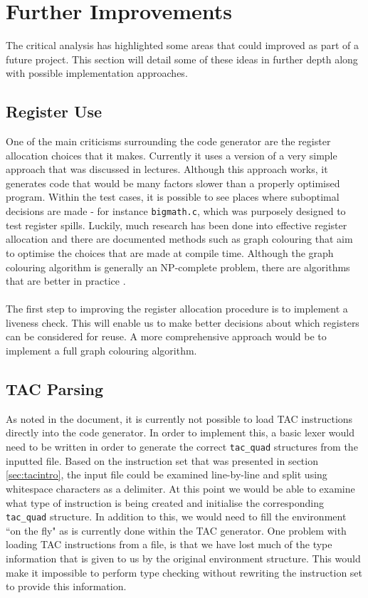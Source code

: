 \chapter{Further Improvements}

The critical analysis has highlighted some areas that could improved as part of a future project. This section will detail some of these ideas in further depth along with possible implementation approaches.

\section{Register Use}
One of the main criticisms surrounding the code generator are the register allocation choices that it makes. Currently it uses a version of a very simple approach that was discussed in lectures. Although this approach works, it generates code that would be many factors slower than a properly optimised program. Within the test cases, it is possible to see places where suboptimal decisions are made - for instance \verb!bigmath.c!, which was purposely designed to test register spills. Luckily, much research has been done into effective register allocation and there are documented methods such as graph colouring that aim to optimise the choices that are made at compile time. Although the graph colouring algorithm is generally an NP-complete problem, there are algorithms that are better in practice \cite{aho2007}.
\ \\ \ \\
The first step to improving the register allocation procedure is to implement a liveness check. This will enable us to make better decisions about which registers can be considered for reuse. A more comprehensive approach would be to implement a full graph colouring algorithm.

\section{TAC Parsing}
As noted in the document, it is currently not possible to load TAC instructions directly into the code generator. In order to implement this, a basic lexer would need to be written in order to generate the correct \verb!tac_quad! structures from the inputted file. Based on the instruction set that was presented in section \ref{sec:tacintro}, the input file could be examined line-by-line and split using whitespace characters as a delimiter. At this point we would be able to examine what type of instruction is being created and initialise the corresponding \verb!tac_quad! structure. In addition to this, we would need to fill the environment ``on the fly" as is currently done within the TAC generator. One problem with loading TAC instructions from a file, is that we have lost much of the type information that is given to us by the original environment structure. This would make it impossible to perform type checking without rewriting the instruction set to provide this information.


